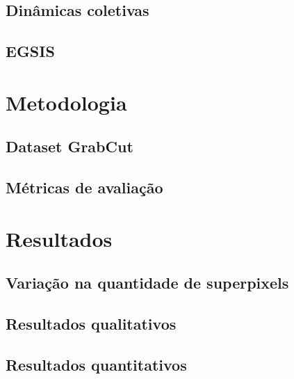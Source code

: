 \documentclass{templatebeamerufc/libs/ufc_format}
\begin{document}
\subsection{Dinâmicas coletivas}
\subsection{EGSIS}

\section{Metodologia}

\subsection{Dataset GrabCut}

\subsection{Métricas de avaliação}


\section{Resultados}

\subsection{Variação na quantidade de superpixels}
\subsection{Resultados qualitativos}
\subsection{Resultados quantitativos}
\end{document}
